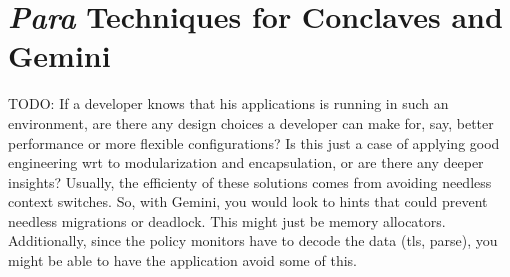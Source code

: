 \section{\emph{Para} Techniques for Conclaves and Gemini}
\label{sec:para}

TODO: If a developer knows that his applications is running in such an
environment, are there any design choices a developer can make for, say, better
performance or more flexible configurations?  Is this just a case of applying
good engineering wrt to modularization and encapsulation, or are there any
deeper insights?  Usually, the efficienty of these solutions comes from
avoiding needless context switches.  So, with Gemini, you would look to hints
that could prevent needless migrations or deadlock.  This might just be memory
allocators.  Additionally, since the policy monitors have to decode the data
(tls, parse), you might be able to have the application avoid some of this.

